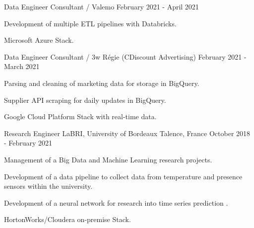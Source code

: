 \begin{cventries}
	\cventry
	{Data Engineer Consultant / Valemo}{}{}
	{February 2021 - April 2021}
	{
		\begin{cvitems}
			\item Development of multiple ETL pipelines with Databricks.
			\item Microsoft Azure Stack.
		\end{cvitems}
	}
	
	\cventry
	{Data Engineer Consultant / 3w Régie (CDiscount Advertising)}{}{}
	{February 2021 - March 2021}
	{
		\begin{cvitems}
			\item Parsing and cleaning of marketing data for storage in BigQuery.
			\item Supplier API scraping for daily updates in BigQuery.
			\item Google Cloud Platform Stack with real-time data.
		\end{cvitems}
	}
	
	\cventry
	{Research Engineer}
	{LaBRI, University of Bordeaux}
	{Talence, France}
	{October 2018 - February 2021}
	{
		\begin{cvitems}
			\item Management of a Big Data and Machine Learning research projects.
			\item Development of a data pipeline to collect data from temperature and presence sensors within the university.
			\item Development of a neural network for research into time series prediction .
			\item HortonWorks/Cloudera on-premise Stack.
		\end{cvitems}
	}
	
\end{cventries}